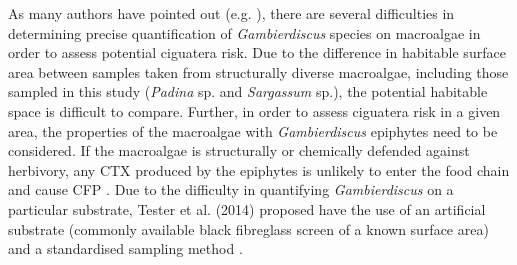 \documentclass[12pt]{article}
\begin{document}

As many authors have pointed out (e.g. \citep{litaker2010global,bomber1989epiphytism,tester2014sampling,cruz2006macroalgal,parsons2011examination,globalcig,lobel1988assessment}), there are several difficulties in determining precise quantification of \textit{Gambierdiscus} species on macroalgae in order to assess potential ciguatera risk. 
Due to the difference in habitable surface area between samples taken from structurally diverse macroalgae, including those sampled in this study (\emph{Padina} sp. and \emph{Sargassum} sp.), the potential habitable space is difficult to compare. 
Further, in order to assess ciguatera risk in a given area, the properties of the macroalgae with \emph{Gambierdiscus} epiphytes need to be considered. 
If the macroalgae is structurally or chemically defended against herbivory, any CTX produced by the epiphytes is unlikely to enter the food chain and cause CFP \citep{cruz2006macroalgal}. 
Due to the difficulty in quantifying \emph{Gambierdiscus} on a particular substrate, Tester et al. (2014) proposed have the use of an artificial substrate (commonly available black fibreglass screen of a known surface area) and a standardised sampling method \citep{tester2014sampling}.
\end{document}
